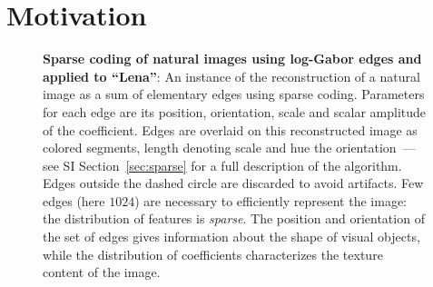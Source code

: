 \documentclass[a4paper, 10pt, twocolumns]{article}
\begin{document}
\section{Motivation}
\begin{figure}[ht!]%
\caption{
{\bf Sparse coding of natural images using log-Gabor edges and applied to ``Lena''}:
An instance of the reconstruction of a natural image as a sum of elementary edges using sparse coding. Parameters for each edge are its position, orientation, scale and scalar amplitude of the coefficient. Edges are overlaid on this reconstructed image as colored segments, length denoting scale and hue the orientation\if{}\ --- see SI Section~\ref{sec:sparse} for a full description of the algorithm\fi. Edges outside the dashed circle are discarded to avoid artifacts. Few edges (here $1024$) are necessary to efficiently represent the image: the distribution of features is \emph{sparse}. The position and orientation of the set of edges gives information about the shape of visual objects, while the distribution of coefficients characterizes the texture content of the image.
\label{fig:EUVIP_lena}}%
\end{figure}%
\end{document}
